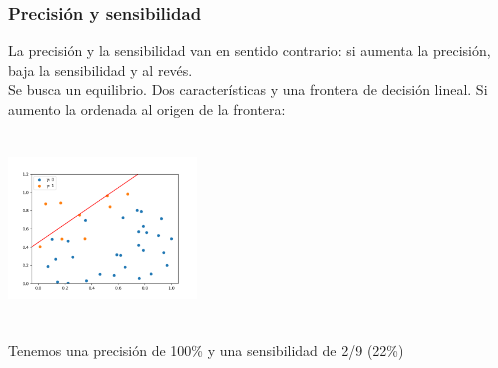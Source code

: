 \documentclass{beamer}
\begin{document}
\begin{frame}
   \frametitle{Precisión y sensibilidad}
   La precisión y la sensibilidad van en sentido contrario: si aumenta
   la precisión, baja la sensibilidad y al revés.\\
   Se busca un equilibrio.
   Dos características y una frontera de decisión lineal. {\footnotesize
     Si aumento
   la ordenada al origen de la frontera:}\\
   \begin{center}
     \includegraphics[height=5cm,width=5cm]{precision_recall_1.png}
   \end{center}
         Tenemos una precisión de 100\% y una sensibilidad de 2/9 (22\%)

   
 \end{frame}
\end{document}
